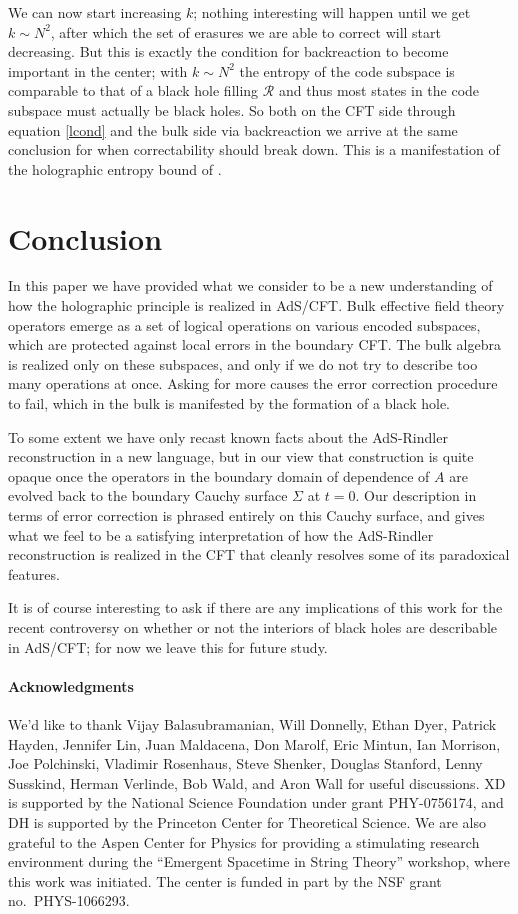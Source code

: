 \documentclass[11pt]{article}
\begin{document}
We can now start increasing $k$; nothing interesting will happen until we get $k\sim N^2$, after which the set of erasures we are able to correct will start decreasing.  But this is exactly the condition for backreaction to become important in the center; with $k\sim N^2$ the entropy of the code subspace is comparable to that of a black hole filling $\mathcal{R}$ and thus most states in the code subspace must actually be black holes.  So both on the CFT side through equation \eqref{lcond} and the bulk side via backreaction we arrive at the same conclusion for when correctability should break down.  This is a manifestation of the holographic entropy bound of \cite{Susskind:1994vu}.  

\section{Conclusion}
In this paper we have provided what we consider to be a new understanding of how the holographic principle is realized in AdS/CFT.  Bulk effective field theory operators emerge as a set of logical operations on various encoded subspaces, which are protected against local errors in the boundary CFT.  The bulk algebra is realized only on these subspaces, and only if we do not try to describe too many operations at once.  Asking for more causes the error correction procedure to fail, which in the bulk is manifested by the formation of a black hole.  

To some extent we have only recast known facts about the AdS-Rindler reconstruction in a new language, but in our view that construction is quite opaque once the operators in the boundary domain of dependence of $A$ are evolved back to the boundary Cauchy surface $\Sigma$ at $t=0$.  Our description in terms of error correction is phrased entirely on this Cauchy surface, and gives what we feel to be a satisfying interpretation of how the AdS-Rindler reconstruction is realized in the CFT that cleanly resolves some of its paradoxical features.    

It is of course interesting to ask if there are any implications of this work for the recent controversy on whether or not the interiors of black holes are describable in AdS/CFT; for now we leave this for future study.

\paragraph{Acknowledgments} We'd like to thank Vijay Balasubramanian, Will Donnelly, Ethan Dyer, Patrick Hayden, Jennifer Lin, Juan Maldacena, Don Marolf, Eric Mintun, Ian Morrison, Joe Polchinski, Vladimir Rosenhaus, Steve Shenker, Douglas Stanford, Lenny Susskind, Herman Verlinde, Bob Wald, and Aron Wall for useful discussions.  XD is supported by the National Science Foundation under grant PHY-0756174, and DH is supported by the Princeton Center for Theoretical Science.  We are also grateful to the Aspen Center for Physics for providing a stimulating research environment during the ``Emergent Spacetime in String Theory'' workshop, where this work was initiated.  The center is funded in part by the NSF grant no.\ PHYS-1066293.
\end{document}
